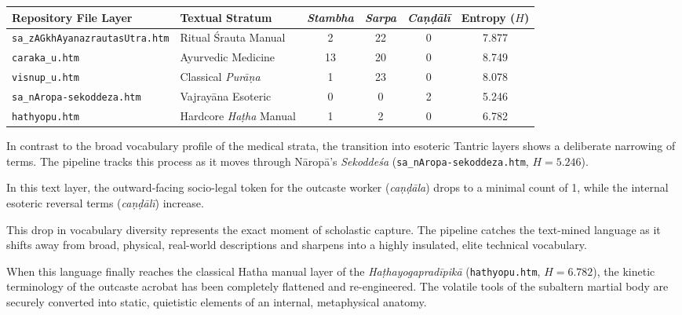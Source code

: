 \documentclass[11pt,twoside,letterpaper]{article}
\begin{document}
\vspace{0.3cm}
\begin{center}
\small\sffamily
\begin{tabular}{ll ccc c}
\hline
\textbf{Repository File Layer} & \textbf{Textual Stratum} & \textit{Stambha} & \textit{Sarpa} & \textit{Caṇḍālī} & \textbf{Entropy ($H$)} \\ \hline
\texttt{sa\_zAGkhAyanazrautasUtra.htm} & Ritual Śrauta Manual & 2 & 22 & 0 & 7.877 \\
\texttt{caraka\_u.htm} & Ayurvedic Medicine & 13 & 20 & 0 & 8.749 \\
\texttt{visnup\_u.htm} & Classical \textit{Purāṇa} & 1 & 23 & 0 & 8.078 \\
\texttt{sa\_nAropa-sekoddeza.htm} & Vajrayāna Esoteric & 0 & 0 & 2 & 5.246 \\
\texttt{hathyopu.htm} & Hardcore \textit{Haṭha} Manual & 1 & 2 & 0 & 6.782 \\ \hline
\end{tabular}
\label{tab:pipeline_metrics_landscape}
\end{center}
\vspace{0.3cm}

In contrast to the broad vocabulary profile of the medical strata, the transition into esoteric Tantric layers shows a deliberate narrowing of terms. The pipeline tracks this process as it moves through Nāropā's \textit{Sekoddeśa} (\texttt{sa\_nAropa-sekoddeza.htm}, $H = 5.246$). 

In this text layer, the outward-facing socio-legal token for the outcaste worker (\textit{caṇḍāla}) drops to a minimal count of 1, while the internal esoteric reversal terms (\textit{caṇḍālī}) increase. 

This drop in vocabulary diversity represents the exact moment of scholastic capture. The pipeline catches the text-mined language as it shifts away from broad, physical, real-world descriptions and sharpens into a highly insulated, elite technical vocabulary. 

When this language finally reaches the classical Hatha manual layer of the \textit{Haṭhayogapradīpikā} (\texttt{hathyopu.htm}, $H = 6.782$), the kinetic terminology of the outcaste acrobat has been completely flattened and re-engineered. The volatile tools of the subaltern martial body are securely converted into static, quietistic elements of an internal, metaphysical anatomy.
\end{document}
